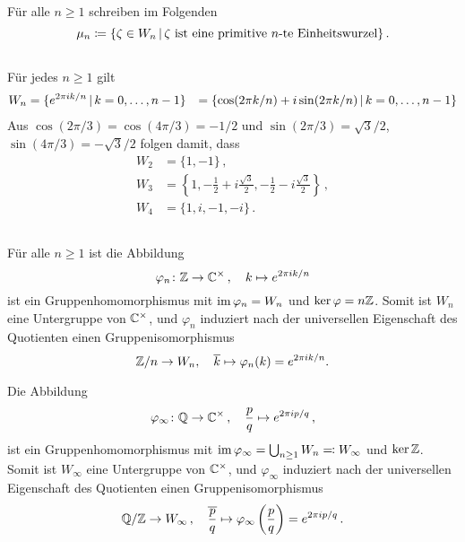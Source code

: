 \section{}

Für alle $n \geq 1$ schreiben im Folgenden
\[
            \mu_n
  \coloneqq \{
              \zeta \in W_n
            \suchthat
              \text{$\zeta$ ist eine primitive $n$-te Einheitswurzel}
            \}\,.
\]





\subsection{}

Für jedes $n \geq 1$ gilt
\begin{align*}
    W_n
  &=  \{
        e^{2 \pi i  k / n}
      \suchthat
        k = 0, \dotsc, n-1
      \}
  &=  \{
        \cos(2 \pi k / n) + i \sin(2 \pi k /n )
      \suchthat
        k = 0, \dotsc, n-1
      \}
\end{align*}
Aus $\cos(2 \pi /3) = \cos(4 \pi / 3)  = -1/2$ und $\sin(2 \pi / 3) = \sqrt{3}/2$, $\sin(4 \pi /3) = -\sqrt{3}/2$ folgen damit, dass
\begin{align*}
  W_2 &= \{ 1, -1 \}\,, \\
  W_3 &= \left\{ 1, -\frac{1}{2} + i \frac{\sqrt{3}}{2}, -\frac{1}{2} - i \frac{\sqrt{3}}{2} \right\}\,, \\
  W_4 &= \{ 1, i, -1, -i \}\,.
\end{align*}





\subsection{}

Für alle $n \geq 1$ ist die Abbildung
\[
          \varphi_n
  \colon  \mathbb{Z}
  \to     \mathbb{C}^\times\,,
  \quad   k
  \mapsto e^{2 \pi i k / n}
\]
ist ein Gruppenhomomorphismus mit $\operatorname{im} \varphi_n = W_n$ und $\ker \varphi = n \mathbb{Z}$.
Somit ist $W_n$ eine Untergruppe von $\mathbb{C}^\times$, und $\varphi_n$ induziert nach der universellen Eigenschaft des Quotienten einen Gruppenisomorphismus
\[
          \mathbb{Z}/n
  \to     W_n,
  \quad   \overline{k}
  \mapsto \varphi_n(k)
  =       e^{2 \pi i k / n}.
\]

Die Abbildung
\[
          \varphi_\infty
  \colon  \mathbb{Q}
  \to     \mathbb{C}^\times\,,
  \quad   \frac{p}{q}
  \mapsto e^{2 \pi i p /q}\,,
\]
ist ein Gruppenhomomorphismus mit $\operatorname{im} \varphi_\infty = \bigcup_{n \geq 1} W_n \eqqcolon W_\infty$ und $\ker \mathbb{Z}$.
Somit ist $W_\infty$ eine Untergruppe von $\mathbb{C}^\times$, und $\varphi_\infty$ induziert nach der universellen Eigenschaft des Quotienten einen Gruppenisomorphismus
\[
          \mathbb{Q}/\mathbb{Z}
  \to     W_\infty\,,
  \quad   \overline{ \frac{p}{q} }
  \mapsto \varphi_\infty\left( \frac{p}{q} \right)
  =       e^{2 \pi i p /q}\,.
\]

